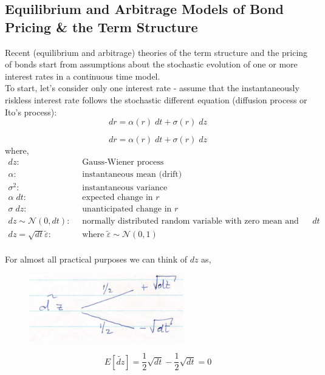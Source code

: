 \documentclass[
14pt,notheorems,hyperref={pdfauthor=whatever}
]{beamer}
\begin{document}
\subsection{Equilibrium and Arbitrage Models of Bond Pricing \& the Term Structure}
\begin{frame}
Recent (equilibrium and arbitrage) theories of the term structure and the pricing of bonds start from assumptions about the stochastic evolution of one or more interest rates in a continuous time model.\\
\hfill\break
To start, let's consider only one interest rate - assume that the instantaneously riskless interest rate follows the stochastic different equation (diffusion process or Ito's process):\\
\begin{equation} \tag{1}
    dr = \alpha(r)\;dt + \sigma(r)\;dz
\end{equation}
\end{frame}

\begin{frame}
\begin{equation} \tag{1}
    dr = \alpha(r)\;dt + \sigma(r)\;dz
\end{equation}
where,
\begin{align*}
    dz: & \;\; \text{Gauss-Wiener process}\\
    \alpha: & \;\; \text{instantaneous mean (drift)}\\
    \sigma^2: & \;\; \text{instantaneous variance}\\
    \alpha\;dt: & \;\; \text{expected change in $r$}\\
    \sigma\;dz: & \;\; \text{unanticipated change in $r$}\\
    dz\sim\mathcal{N}(0,dt): & \;\; \text{normally distributed random variable with zero mean and variance $dt$}\\
    dz=\sqrt{dt}\tilde\varepsilon: & \;\; \text{where $\tilde\varepsilon \sim \mathcal{N}(0,1)$}\\
\end{align*}
\end{frame}

\begin{frame}
For almost all practical purposes we can think of $dz$ as,\\
\begin{figure}[dz]
    \includegraphics[width=0.6\textwidth]{images/L17-dz.png}
    \centering
\end{figure}
\[ E[\tilde{dz}] = \frac{1}{2}\sqrt{dt} - \frac{1}{2}\sqrt{dt} = 0 \]
\end{frame}
\end{document}
